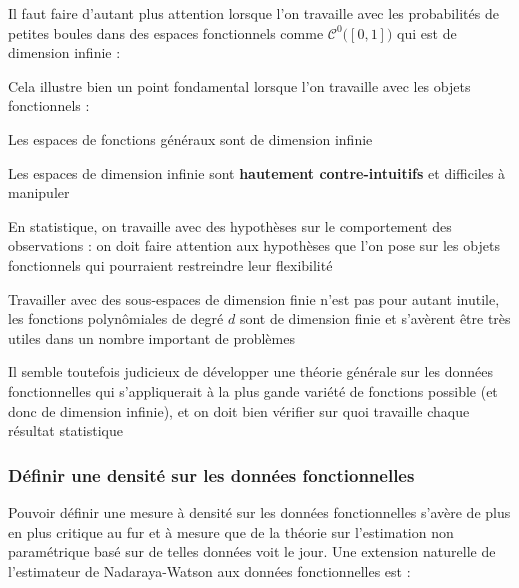 {{        Il faut faire d'autant plus attention lorsque l'on travaille avec les probabilités de petites boules dans des espaces fonctionnels comme $\mathcal C^0 \bigl( [0,1] \bigr)$ qui est de dimension infinie :


        \noindent Cela illustre bien un point fondamental lorsque l'on travaille avec les objets fonctionnels :

        \begin{todolist}
            \item Les espaces de fonctions généraux sont de dimension infinie
            \item[\crossed] Les espaces de dimension infinie sont \textbf{hautement contre-intuitifs} et difficiles à manipuler
            \item En statistique, on travaille avec des hypothèses sur le comportement des observations : on doit faire attention aux hypothèses que l'on pose sur les objets fonctionnels qui pourraient restreindre leur flexibilité
            \item[\checked] Travailler avec des sous-espaces de dimension finie n'est pas pour autant inutile, les fonctions polynômiales de degré $d$ sont de dimension finie et s'avèrent être très utiles dans un nombre important de problèmes
            \item[\crossed] Il semble toutefois judicieux de développer une théorie générale sur les données fonctionnelles qui s'appliquerait à la plus gande variété de fonctions possible (et donc de dimension infinie), et on doit bien vérifier sur quoi travaille chaque résultat statistique 
            
        \end{todolist}


        \subsubsection{Définir une densité sur les données fonctionnelles}
        
        Pouvoir définir une mesure à densité sur les données fonctionnelles s'avère de plus en plus critique au fur et à mesure que de la théorie sur l'estimation non paramétrique basé sur de telles données voit le jour.
        Une extension naturelle de l'estimateur de Nadaraya-Watson aux données fonctionnelles est :

}}

